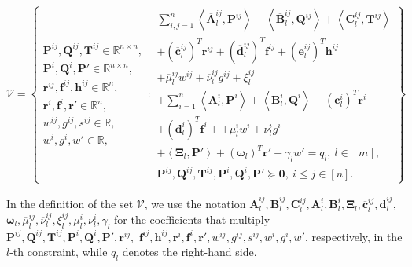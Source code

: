 \documentclass[opre,nonblindrev]{informs3} %
\begin{document}
\begin{equation*}
    \mathcal{V} = \left\{ \begin{array}{c} 
    \boldsymbol{P}^{ij}, \boldsymbol{Q}^{ij}, \boldsymbol{T}^{ij} \in \mathbb{R}^{n \times n}, \\ 
     \boldsymbol{P}^{i}, \boldsymbol{Q}^{i}, \boldsymbol{P}' \in \mathbb{R}^{n \times n}, \\
    \boldsymbol{r}^{ij}, \boldsymbol{f}^{ij}, \boldsymbol{h}^{ij} \in \mathbb{R}^n, \\
    \boldsymbol{r}^{i}, \boldsymbol{f}^{i}, \boldsymbol{r}' \in \mathbb{R}^n, \\ 
    w^{ij}, g^{ij}, s^{ij} \in \mathbb{R}, \\
    w^{i}, g^{i}, w' \in \mathbb{R}, \end{array} :  \begin{array}{lr}
	 \sum_{i,j=1}^n \left \langle \overline{\boldsymbol{A}}_l^{ij}, \boldsymbol{P}^{ij} \right \rangle + \left \langle \overline{\boldsymbol{B}}_l^{ij}, \boldsymbol{Q}^{ij} \right \rangle + \left \langle \boldsymbol{C}_l^{ij}, \boldsymbol{T}^{ij} \right \rangle \\ 
     + \left( \overline{\boldsymbol{c}}_l^{ij} \right)^T \boldsymbol{r}^{ij}  + \left( \overline{\boldsymbol{d}}_l^{ij} \right)^T \boldsymbol{f}^{ij} + \left( \boldsymbol{e}_l^{ij} \right)^T \boldsymbol{h}^{ij} \\ 
     + \overline{\mu}_l^{ij} w^{ij} + \overline{\nu}_l^{ij} g^{ij} + \xi_l^{ij} \\ 
     + \sum_{i=1}^n \left \langle \boldsymbol{A}_l^{i}, \boldsymbol{P}^{i} \right \rangle + \left \langle \boldsymbol{B}_l^{i}, \boldsymbol{Q}^{i} \right \rangle + \left(\boldsymbol{c}_l^i\right)^T \boldsymbol{r}^i  \\ 
      + \left(\boldsymbol{d}_l^i\right)^T \boldsymbol{f}^i + + \mu_l^{i} w^{i} + \nu_l^{i} g^{i} \\ 
     + \left \langle \boldsymbol{\Xi}_l, \boldsymbol{P}' \right \rangle + \left(\boldsymbol{\omega}_l \right)^T \boldsymbol{r}' + \gamma_l w' = q_l, \: l \in [m], \\ 
    \boldsymbol{P}^{ij}, \boldsymbol{Q}^{ij}, \boldsymbol{T}^{ij}, \boldsymbol{P}^i, \boldsymbol{Q}^i, \boldsymbol{P}' \succeq \boldsymbol{0}, \ i \le j \in [n].
	 \end{array}  \right\}
\end{equation*}  

{\color{black} In the definition of the set $\mathcal{V}$, we use the notation $\overline{\boldsymbol{A}}_l^{ij}, \overline{\boldsymbol{B}}_l^{ij}, \boldsymbol{C}_l^{ij}, \boldsymbol{A}_l^{i}, \boldsymbol{B}_l^{i}, \boldsymbol{\Xi}_l, \overline{\boldsymbol{c}}_l^{ij}, \overline{\boldsymbol{d}}_l^{ij},$ $\boldsymbol{\omega}_l, \overline{\mu}_l^{ij}, \overline{\nu}_l^{ij}, \xi_l^{ij}, \mu_l^{i}, \nu_l^{i}, \gamma_l$ for the coefficients that multiply $\boldsymbol{P}^{ij},\boldsymbol{Q}^{ij},\boldsymbol{T}^{ij},\boldsymbol{P}^i,\boldsymbol{Q}^i,\boldsymbol{P}',\boldsymbol{r}^{ij},$ $\boldsymbol{f}^{ij},\boldsymbol{h}^{ij},\boldsymbol{r}^i,\boldsymbol{f}^i,\boldsymbol{r}',w^{ij},g^{ij},s^{ij},w^i,g^i,w'$, respectively, in the $l$-th constraint, while $q_l$ denotes the right-hand side.}
\end{document}
